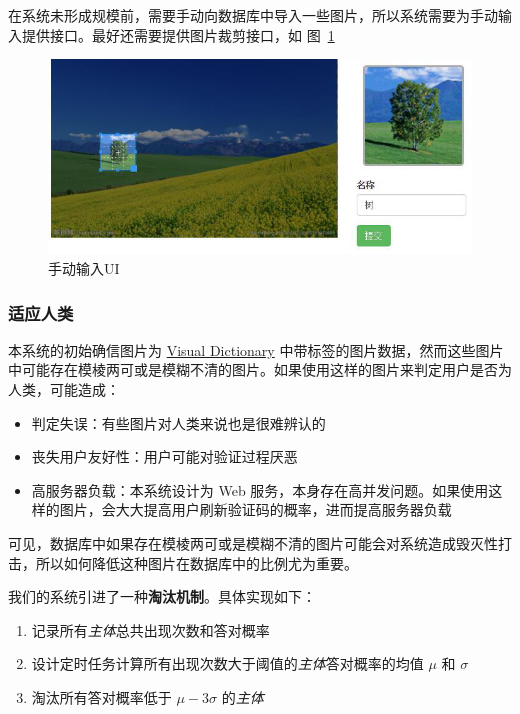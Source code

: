 \documentclass[bachelor,zhspacing]{cqu}  %
\def\tightlist{}
\begin{document}
在系统未形成规模前，需要手动向数据库中导入一些图片，所以系统需要为手动输入提供接口。最好还需要提供图片裁剪接口，如
图~\ref{fig:manual-ui}

\begin{figure}[htbp]
\centering
\includegraphics{pic/manual-ui.jpg}
\caption{手动输入UI}\label{fig:manual-ui}
\end{figure}

\subsubsection{适应人类}\label{ux9002ux5e94ux4ebaux7c7b}

本系统的初始确信图片为
\href{http://groups.csail.mit.edu/vision/TinyImages/}{Visual Dictionary}
中带标签的图片数据，然而这些图片中可能存在模棱两可或是模糊不清的图片。如果使用这样的图片来判定用户是否为人类，可能造成：

\begin{itemize}
\tightlist
\item
  判定失误：有些图片对人类来说也是很难辨认的
\item
  丧失用户友好性：用户可能对验证过程厌恶
\item
  高服务器负载：本系统设计为 Web
  服务，本身存在高并发问题。如果使用这样的图片，会大大提高用户刷新验证码的概率，进而提高服务器负载
\end{itemize}

可见，数据库中如果存在模棱两可或是模糊不清的图片可能会对系统造成毁灭性打击，所以如何降低这种图片在数据库中的比例尤为重要。

我们的系统引进了一种\textbf{淘汰机制}。具体实现如下：

\begin{enumerate}
\def\labelenumi{\arabic{enumi}.}
\item
  记录所有\emph{主体}总共出现次数和答对概率
\item
  设计定时任务计算所有出现次数大于阈值的\emph{主体}答对概率的均值
  \(\mu\) 和 \(\sigma\)
\item
  淘汰所有答对概率低于 \(\mu-3\sigma\) 的\emph{主体}
\end{enumerate}
\end{document}
